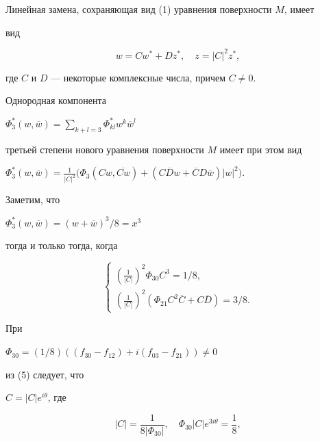 Линейная замена, сохраняющая вид (1) уравнения поверхности $M$, имеет


вид


\begin{equation}


w=C w^*+D z^*, \quad z=| C |^2 z^* ,


\end{equation}


где $C$ и $D$ --- некоторые комплексные числа, причем $C \ne 0$.





Однородная компонента


$\Phi^*_3 (w, \overline w)=\sum\limits_{k+l=3}


\Phi^*_{kl} w^k \overline w^l$


третьей степени нового уравнения поверхности $M$ имеет при этом вид


$\Phi^*_3 (w, \overline w)=


\frac1{|C|^2} \big(\Phi_3 (C w, \overline {Cw})+


(C \overline D w+\overline C D \overline w) |w|^2 \big)$.


Заметим, что


$ \Phi^*_3 (w, \overline w)=(w+\overline w)^3/8=x^3 $


тогда и только тогда, когда


\begin{equation}


\begin{cases}


(\frac1{|C|})^2 \Phi_{30} C^3=1/8, \\


(\frac1{|C|})^2 (\Phi_{21} C^2 \overline C+C \overline D)=3/8 .


\end{cases}


\end{equation}





При


$\Phi_{30}=(1/8) ((f_{30} - f_{12})+i (f_{03} - f_{21})) \ne 0$


из (5) следует, что


$C=| C | e^{i \theta}$, где


\begin{equation}


| C |=\frac1{8 | \Phi_{30} |}, \quad


\Phi_{30} | C | e^{3 i \theta}=\frac18,


\end{equation}


